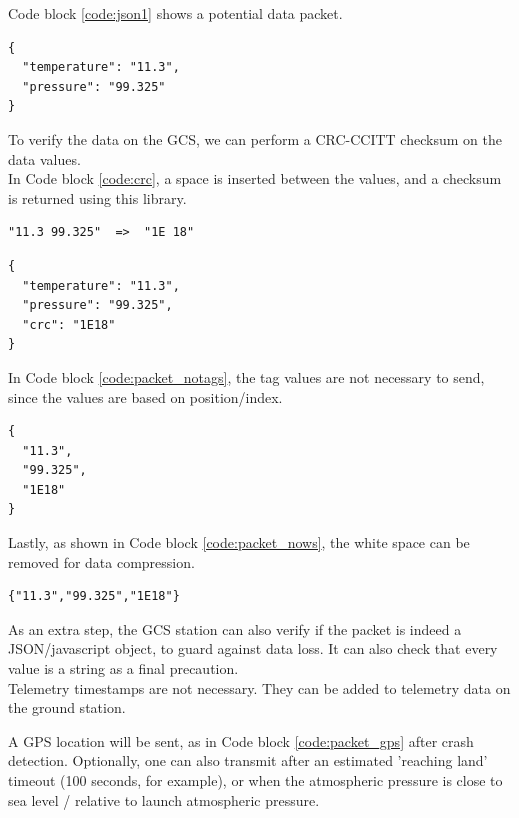 Code block \ref{code:json1} shows a potential data packet.

\begin{lstlisting}
{
  "temperature": "11.3",
  "pressure": "99.325"
}
\end{lstlisting}

To verify the data on the GCS, we can perform a CRC-CCITT checksum on the data values\cite{crc-cal}.\\

In Code block \ref{code:crc}, a space is inserted between the values, and a checksum is returned using this library\cite{crc-lib}.

\begin{lstlisting}
"11.3 99.325"  =>  "1E 18"
\end{lstlisting}

\begin{lstlisting}
{
  "temperature": "11.3",
  "pressure": "99.325",
  "crc": "1E18"
}
\end{lstlisting}

In Code block \ref{code:packet_notags}, the tag values are not necessary to send, since the values are based on position/index.


\begin{lstlisting}
{
  "11.3",
  "99.325",
  "1E18"
}
\end{lstlisting}

Lastly, as shown in Code block \ref{code:packet_nows}, the white space can be removed for data compression.

\begin{lstlisting}
{"11.3","99.325","1E18"}
\end{lstlisting}

As an extra step, the GCS station can also verify if the packet is indeed a JSON/javascript object, to guard against data loss. It can also check that every value is a string as a final precaution.\\

Telemetry timestamps are not necessary. They can be added to telemetry data on the ground station.

A GPS location will be sent, as in Code block \ref{code:packet_gps} after crash detection. Optionally, one can also transmit after an estimated 'reaching land' timeout (100 seconds, for example), or when the atmospheric pressure is close to sea level / relative to launch atmospheric pressure.

